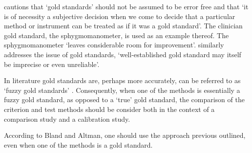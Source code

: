 \documentclass[12pt, a4paper]{report}
\theoremstyle{plain}
\theoremstyle{definition}
\theoremstyle{remark}
\begin{document}
	
	
	\citet[p.47]{DunnSEME} cautions that `gold standards' should not be
	assumed to be error free and that `it is of necessity a subjective
	decision when we come to decide that a particular method or
	instrument can be treated as if it was a gold standard'. The
	clinician gold standard, the sphygmomanometer, is used as an
	example thereof.  The sphygmomanometer `leaves considerable room
	for improvement'. \citet{pizzi} similarly
	addresses the issue of gold standards, `well-established gold
	standard may itself be imprecise or even unreliable'.
	
	

	
	In literature gold standards are, perhaps more accurately, can be referred to as
	`fuzzy gold standards' \citep{phelps}. Consequently, when one of the methods is
	essentially a fuzzy gold standard, as opposed to a `true' gold standard, the comparison of the criterion and test methods should
	be consider both in the context of a comparison study and a	calibration study.
	
	
	According to Bland and Altman, one should use the approach previous outlined, even when one of the methods is a gold standard.
	
	
\end{document}
